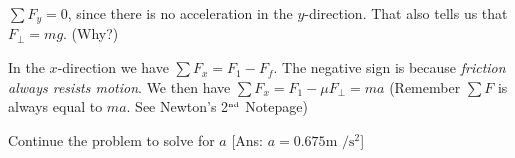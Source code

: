 \documentclass[12pt]{report}
\newcommand{\m}{\mbox{m }}
\newcommand{\s}{\mbox{s}}
\begin{document}
\vspace{1cm}

\hspace{2cm} \parbox{6cm}{$\sum F_y = 0$, since there is no acceleration in the $y$-direction.  That also tells us that $F_\bot = mg$. (Why?)} \hfill \parbox{6cm}{In the $x$-direction we have $\sum F_x = F_1 - F_f$.  The negative sign is because \emph{friction always resists motion}.  We then have $\sum F_x = F_1 - \mu F_\bot=ma$ (Remember $\sum F$ is always equal to $ma$.  See Newton's 2$^{\mbox{\tiny nd}}$ Notepage)} \hspace{2cm}

\vfill

\hfill Continue the problem to solve for $a$ \hfill [Ans: $a = 0.675 \m/\s^2$] \hfill \mbox{}
\end{document}
